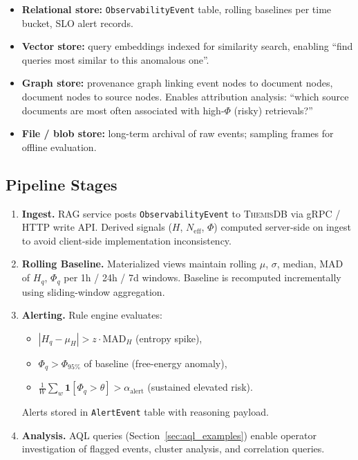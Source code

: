 \documentclass[11pt,a4paper]{article}
\newcommand{\themisdb}{\textsc{ThemisDB}}
\theoremstyle{definition}
\begin{document}
\begin{itemize}[noitemsep]
  \item \textbf{Relational store:} \texttt{ObservabilityEvent} table,
    rolling baselines per time bucket, SLO alert records.
  \item \textbf{Vector store:} query embeddings indexed for similarity
    search, enabling ``find queries most similar to this anomalous one''.
  \item \textbf{Graph store:} provenance graph linking event nodes to
    document nodes, document nodes to source nodes.
    Enables attribution analysis: ``which source documents are most
    often associated with high-$\Phi$ (risky) retrievals?''
  \item \textbf{File / blob store:} long-term archival of raw events;
    sampling frames for offline evaluation.
\end{itemize}

\subsection{Pipeline Stages}

\begin{enumerate}[label=\textbf{Stage \arabic*.}, leftmargin=*]
  \item \textbf{Ingest.} RAG service posts \texttt{ObservabilityEvent}
    to \themisdb{} via gRPC / HTTP write API.
    Derived signals ($H$, $N_\text{eff}$, $\Phi$) computed server-side
    on ingest to avoid client-side implementation inconsistency.
  \item \textbf{Rolling Baseline.} Materialized views maintain
    rolling $\mu$, $\sigma$, median, MAD of $H_q$, $\Phi_q$
    per 1h / 24h / 7d windows.
    Baseline is recomputed incrementally using sliding-window aggregation.
  \item \textbf{Alerting.} Rule engine evaluates:
    \begin{itemize}[noitemsep]
      \item $|H_q - \mu_H| > z \cdot \text{MAD}_H$ (entropy spike),
      \item $\Phi_q > \Phi_{95\%}$ of baseline (free-energy anomaly),
      \item $\frac{1}{W}\sum_{w} \mathbf{1}[\Phi_q > \theta]
            > \alpha_\text{alert}$ (sustained elevated risk).
    \end{itemize}
    Alerts stored in \texttt{AlertEvent} table with reasoning payload.
  \item \textbf{Analysis.} AQL queries (Section~\ref{sec:aql_examples})
    enable operator investigation of flagged events, cluster analysis,
    and correlation queries.
\end{enumerate}
\end{document}

